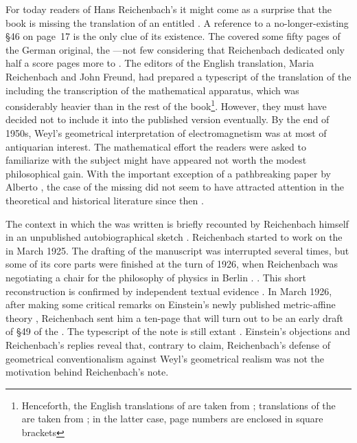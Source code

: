 \documentclass[submitted]{article}
\newcommand{\PRZL}{\citetitle{Reichenbach1928}\xspace}
\begin{document}
For today readers of Hans Reichenbach's  \citep{Reichenbach1958} it might come as a surprise that the book is missing the translation of an \Ap entitled . A reference to a no-longer-existing \S46 on page~17 is the only clue of its existence. The \Ap covered some fifty pages of the German original, the \PRZL \citep{Reichenbach1928}---not few considering that Reichenbach dedicated only half a score pages more to \gr. The editors of the English translation, Maria Reichenbach and John Freund, had prepared a typescript of the translation of the \Ap \citep[041-2101]{HR} including the transcription of the mathematical apparatus, which was considerably heavier than in the rest of the book\footnote{Henceforth, the English translations of \PRZL are taken from \cite{Reichenbach1958}; translations of the \Ap are taken from \cite[041-2101]{HR}; in the latter case, page numbers are enclosed in square brackets}. However, they must have decided not to include it into the published version eventually. By the end of 1950s, Weyl's geometrical interpretation of electromagnetism was at most of antiquarian interest. The mathematical effort the readers were asked to familiarize with the subject might have appeared not worth the modest philosophical gain. With the important exception of a pathbreaking paper by Alberto \citet{Coffa1979}, the case of the missing \Ap did not seem to have attracted attention in the theoretical and historical literature since then .

The context in which the \Ap was written is briefly recounted by Reichenbach himself in an unpublished autobiographical sketch \citep[044-06-25]{HR}. Reichenbach started to work on the \PRZL in March 1925. The drafting of the manuscript was interrupted several times, but some of its core parts were finished at the turn of 1926, when Reichenbach was negotiating a chair for the philosophy of physics in Berlin \citep{Hecht1982}.  \citep[044-06-25]{HR}. This short reconstruction is confirmed by independent textual evidence . In March 1926, after making some critical remarks on Einstein's newly published metric-affine theory \citep{Einstein1925a}, Reichenbach sent him a ten-page  that will turn out to be an early draft of \S49 of the \Ap. The typescript of the note is still extant \citep[025-05-10]{HR}. Einstein's objections and Reichenbach's replies reveal that, contrary to  claim, Reichenbach's defense of geometrical conventionalism against Weyl's geometrical realism  was not the motivation behind Reichenbach's note.
\end{document}
